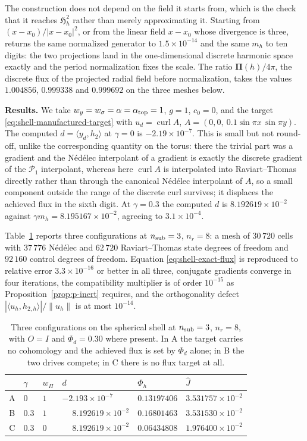 \documentclass{article}
\DeclareMathOperator{\curl}{curl}
\newcommand{\HH}{\mathfrak H}
\newcommand{\Piop}{\boldsymbol\Pi}
\newcommand{\ip}[2]{\langle #1,#2\rangle}
\newcommand{\norm}[1]{\lVert #1\rVert}
\begin{document}
The construction does not depend on the field it starts from, which is
the check that it reaches $\HH^2_h$ rather than merely approximating
it. Starting from $(x-x_0)/|x-x_0|^2$, or from the linear field
$x-x_0$ whose divergence is three, returns the same normalized
generator to $1.5\times10^{-14}$ and the same $m_h$ to ten digits: the
two projections land in the one-dimensional discrete harmonic space
exactly and the period normalization fixes the scale. The ratio
$\Piop(h)/4\pi$, the discrete flux of the projected radial field before
normalization, takes the values $1.004856$, $0.999338$ and $0.999692$
on the three meshes below.
 
\medskip
\noindent\textbf{Results.}
We take $w_y=w_\sigma=\alpha=\alpha_{\rm top}=1$, $g=1$, $c_0=0$, and
the target \eqref{eq:shell-manufactured-target} with
$u_d=\curl A$, $A=(0,0,\ 0.1\sin\pi x\,\sin\pi y)$. The computed
$d=\ip{y_d}{h_2}$ at $\gamma=0$ is $-2.19\times10^{-7}$. This is small
but not round-off, unlike the corresponding quantity on the torus:
there the trivial part was a gradient and the N\'ed\'elec interpolant
of a gradient is exactly the discrete gradient of the $\mathcal P_1$
interpolant, whereas here $\curl A$ is interpolated into
Raviart--Thomas directly rather than through the canonical N\'ed\'elec
interpolant of $A$, so a small component outside the range of the
discrete curl survives; it displaces the achieved flux in the sixth
digit. At $\gamma=0.3$ the computed $d$ is $8.192619\times10^{-2}$
against $\gamma m_h=8.195167\times10^{-2}$, agreeing to
$3.1\times10^{-4}$.
 
Table~\ref{tab:shell-runs} reports three configurations at
$n_{\rm sub}=3$, $n_r=8$: a mesh of $30\,720$ cells with $37\,776$
N\'ed\'elec and $62\,720$ Raviart--Thomas state degrees of freedom and
$92\,160$ control degrees of freedom. Equation
\eqref{eq:shell-exact-flux} is reproduced to relative error
$3.3\times10^{-16}$ or better in all three, conjugate gradients
converge in four iterations, the compatibility multiplier is of order
$10^{-15}$ as Proposition~\ref{prop:p-inert} requires, and the
orthogonality defect $|\ip{u_h}{h_{2,h}}|/\norm{u_h}$ is at most
$10^{-14}$.
 
\begin{table}[htbp]
\centering
\begin{tabular}{clllll}
\toprule
 & $\gamma$ & $w_\Pi$ & $d$ & $\Phi_h$ & $\widehat J$\\
\midrule
A & $0$   & $1$ & $-2.193\times10^{-7}$ & $0.13197406$
  & $3.531757\times10^{-2}$\\
B & $0.3$ & $1$ & $\phantom{-}8.192619\times10^{-2}$ & $0.16801463$
  & $3.531530\times10^{-2}$\\
C & $0.3$ & $0$ & $\phantom{-}8.192619\times10^{-2}$ & $0.06434808$
  & $1.976400\times10^{-2}$\\
\bottomrule
\end{tabular}
\caption{Three configurations on the spherical shell at
$n_{\rm sub}=3$, $n_r=8$, with $O=I$ and $\Phi_d=0.30$ where present.
In A the target carries no cohomology and the achieved flux is set by
$\Phi_d$ alone; in B the two drives compete; in C there is no flux
target at all.}
\label{tab:shell-runs}
\end{table}
 
\end{document}
